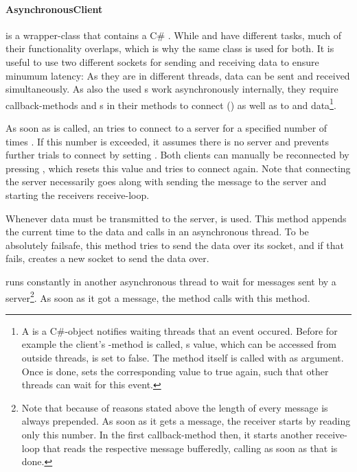 \paragraph{AsynchronousClient} is a wrapper-class that contains a C\# . While  and  have different tasks, much of their functionality overlaps, which is why the same class is used for both. It is useful to use two different sockets for sending and receiving data to ensure minumum latency: As they are in different threads, data can be sent and received simultaneously. As also the used s work asynchronously internally, they require callback-methods and s in their methods to connect () as well as to  and  data\footnote{A  is a C\#-object notifies waiting threads that an event occured. Before for example the client's -method is called, s value, which can be accessed from outside threads, is set to false. The method itself is called with  as argument. Once  is done,  sets the corresponding value to true again, such that other threads can wait for this event.}.

As soon as  is called, an  tries to connect to a server for a specified number of times . If this number is exceeded, it assumes there is no server and prevents further trials to connect by setting . Both clients can manually be reconnected by pressing , which resets this value and tries to connect again. Note that connecting the server necessarily goes along with sending the message  to the server and starting the receivers receive-loop. 

Whenever data must be transmitted to the server,  is used. This method appends the current time to the data and calls  in an asynchronous thread. To be absolutely failsafe, this method tries to send the data over its socket, and if that fails, creates a new socket to send the data over. 

 runs constantly in another asynchronous thread to wait for messages sent by a server\footnote{Note that because of reasons stated above the length of every message is always prepended. As soon as it gets a message, the receiver starts by reading only this number. In the first callback-method  then, it starts another receive-loop that reads the respective message bufferedly, calling  as soon as that is done.}. As soon as it got a message, the method  calls  with this method.

